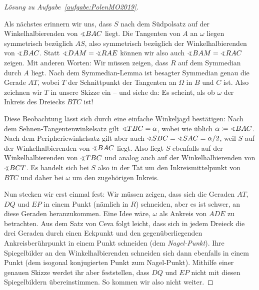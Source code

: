 \begin{proof}[Lösung zu Aufgabe~\ref{aufgabe:PolenMO2019}]
\begin{figure}[ht]
	\end{figure}
	
	Als nächstes erinnern wir uns, dass $S$ nach dem Südpolsatz auf der Winkelhalbierenden von $\winkel BAC$ liegt. Die Tangenten von $A$ an $\omega$ liegen symmetrisch bezüglich $AS$, also symmetrisch bezüglich der Winkelhalbierenden von $\winkel BAC$. Statt $\winkel DAM=\winkel RAE$ können wir also auch $\winkel BAM=\winkel RAC$ zeigen. Mit anderen Worten: Wir müssen zeigen, dass $R$ auf dem Symmedian durch $A$ liegt. Nach dem Symmedian-Lemma ist besagter Symmedian genau die Gerade $AT$, wobei $T$ der Schnittpunkt der Tangenten an $\Omega$ in $B$ und $C$ ist. Also zeichnen wir $T$ in unsere Skizze ein -- und siehe da: Es scheint, als ob $\omega$ der Inkreis des Dreiecks $BTC$ ist!
	
	Diese Beobachtung lässt sich durch eine einfache Winkeljagd bestätigen: Nach dem Sehnen-Tangentenwinkelsatz gilt $\winkel TBC=\alpha$, wobei wie üblich $\alpha\coloneqq \winkel BAC$. Nach dem Peripheriewinkelsatz gilt aber auch $\winkel SBC=\winkel SAC=\alpha/2$, weil $S$ auf der Winkelhalbierenden von $\winkel BAC$ liegt. Also liegt $S$ ebenfalls auf der Winkelhalbierenden von $\winkel TBC$ und analog auch auf der Winkelhalbierenden von $\winkel BCT$. Es handelt sich bei $S$ also in der Tat um den Inkreismittelpunkt von $BTC$ und daher bei $\omega$ um den zugehörigen Inkreis.
	
	Nun stecken wir erst einmal fest: Wir müssen zeigen, dass sich die Geraden $AT$, $DQ$ und $EP$ in einem Punkt (nämlich in $R$) schneiden, aber es ist schwer, an diese Geraden heranzukommen. Eine Idee wäre, $\omega$ als Ankreis von $ADE$ zu betrachten. Aus dem Satz von Ceva folgt leicht, dass sich in jedem Dreieck die drei Geraden durch einen Eckpunkt und den gegenüberliegenden Ankreisberührpunkt in einem Punkt schneiden (dem \emph{Nagel-Punkt}). Ihre Spiegelbilder an den Winkelhalbierenden schneiden sich dann ebenfalls in einem Punkt (dem isogonal konjugierten Punkt zum Nagel-Punkt). Mithilfe einer genauen Skizze werdet ihr aber feststellen, dass $DQ$ und $EP$ nicht mit diesen Spiegelbildern übereinstimmen. So kommen wir also nicht weiter.
	

\end{proof}
